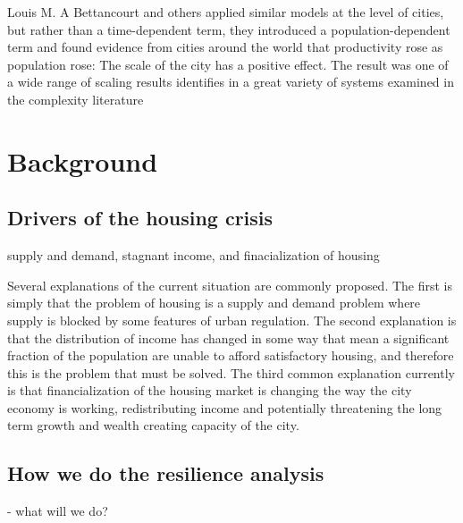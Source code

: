 Louis M. A Bettancourt and others applied similar models at the level of cities, but rather than a time-dependent term, they introduced a population-dependent term and found evidence from cities around the world that productivity rose as population rose: The scale of the city has a positive effect. The result  was one of a wide range of scaling results identifies in a great variety of systems examined in the complexity literature 


\section{Background}

\subsection{Drivers of the housing crisis}
supply and demand, stagnant income, and finacialization of housing

Several explanations of the current situation are commonly proposed. The first is simply that the problem of housing is a supply and demand problem where supply is blocked by some features of urban regulation. The second explanation is that the distribution of income has changed in some way that mean a significant fraction of the population are unable to afford satisfactory housing, and therefore this is the problem that must be solved.  The third common explanation currently is that financialization of the housing market  is changing the way the city economy is working, redistributing income and potentially threatening the long term growth and wealth creating capacity of the city.


\subsection{How we do the resilience analysis}

- what will we do?
